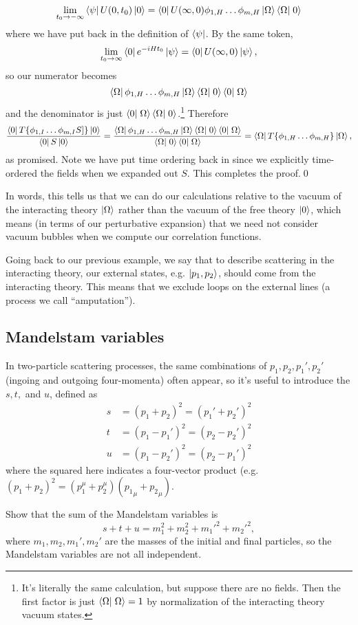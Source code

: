 $$\lim_{t_0\to-\infty} \bra{\psi}U(0,t_0)\ket{0}=\bra{0}U(\infty,0)\phi_{1,H}\ldots \phi_{m,H}\ket{\Omega}\braket{\Omega}{0}$$
where we have put back in the definition of $\left< \psi \right|$. By the same token,
$$\lim_{t_0\to\infty}\left< 0 \right|e^{-iHt_0}\left| \psi \right>=\left< 0 \right|U(\infty,0)\left| \psi \right>,$$
so our numerator becomes
$$\bra{\Omega}\phi_{1,H}\ldots \phi_{m,H}\ket{\Omega}\braket{\Omega}{0}\braket{0}{\Omega}$$
and the denominator is just $\braket{0}{\Omega}\braket{\Omega}{0}$.\footnote{It's literally the same calculation, but suppose there are no fields. Then the first factor is just $\braket{\Omega}{\Omega}=1$ by normalization of the interacting theory vacuum states.} Therefore
$$\frac{\bra{0}T \set{\phi_{1,I}\ldots \phi_{m,I}S]}\ket{0}}{\bra{0}S\ket{0}}=\frac{\bra{\Omega}\phi_{1,H}\ldots \phi_{m,H}\ket{\Omega}\braket{\Omega}{0}\braket{0}{\Omega}}{\braket{\Omega}{0}\braket{0}{\Omega}}=\bra{\Omega}T\set{\phi_{1,H}\ldots \phi_{m,H}}\ket{\Omega},
$$
as promised. Note we have put time ordering back in since we explicitly time-ordered the fields when we expanded out $S$. This completes the proof.\qed

In words, this tells us that we can do our calculations relative to the vacuum of the interacting theory $\left| \Omega \right>$ rather than the vacuum of the free theory $\left| 0 \right>$, which means (in terms of our perturbative expansion) that we need not consider vacuum bubbles when we compute our correlation functions.

Going back to our previous example, we say that to describe scattering in the interacting theory, our external states, e.g. $\left| p_1,p_2 \right>$, should come from the interacting theory. This means that we exclude loops on the external lines (a process we call ``amputation'').

\subsection*{Mandelstam variables} In two-particle scattering processes, the same combinations of $p_1,p_2,p_1',p_2'$ (ingoing and outgoing four-momenta) often appear, so it's useful to introduce the  $s,t,$ and $u$, defined as
\begin{align*}
s&=(p_1+p_2)^2=(p_1'+p_2')^2\\
t&=(p_1-p_1')^2=(p_2-p_2')^2\\
u&=(p_1-p_2')^2=(p_2-p_1')^2
\end{align*}
where the squared here indicates a four-vector product (e.g. $(p_1+p_2)^2=(p_1^\mu+p_2^\mu)({p_1}_\mu+{p_2}_\mu).$
\begin{ex}
Show that the sum of the Mandelstam variables is
$$s+t+u=m_1^2+m_2^2+{m_1'}^2+{m_2'}^2,$$
where $m_1,m_2,m_1',m_2'$ are the masses of the initial and final particles, so the Mandelstam variables are not all independent.
\end{ex}


